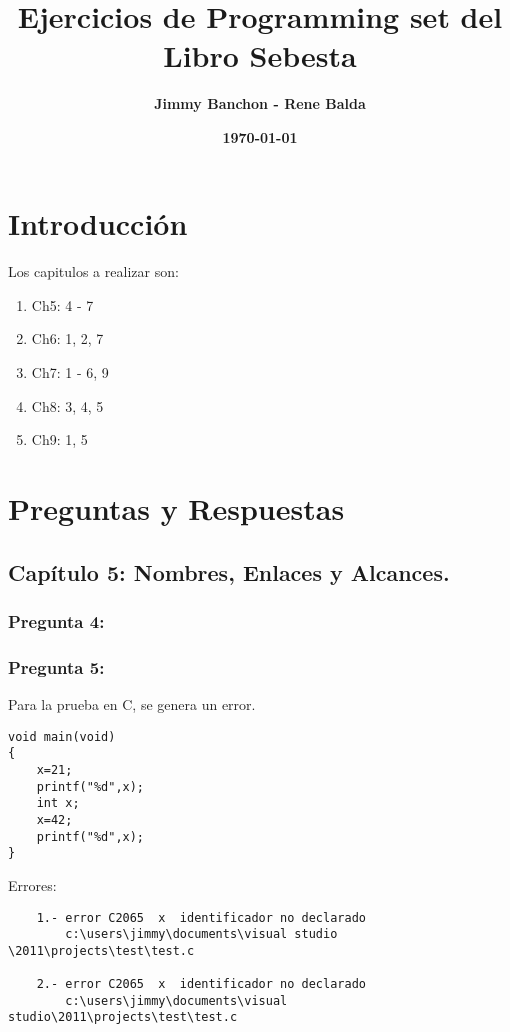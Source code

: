 \documentclass[11pt]{article}
\title{\textbf{Ejercicios de Programming set del Libro Sebesta}}
\author{\textbf{Jimmy Banchon - Rene Balda}}
\date{\textbf{\today}}
\begin{document}
\maketitle

\section{Introducción}
\paragraph{} \noindent
Los capitulos a realizar son:
\begin{enumerate}
\item
 Ch5: 4 - 7
\item
 Ch6: 1, 2, 7
\item
 Ch7: 1 - 6, 9
\item
 Ch8: 3, 4, 5
\item
 Ch9: 1, 5
\end{enumerate}

\section{Preguntas y Respuestas}

\subsection{Capítulo 5: Nombres, Enlaces y Alcances.}
\subsubsection{Pregunta 4:}


\subsubsection{Pregunta 5:}
Para la prueba en C, se genera un error.
\begin{lstlisting}[frame=single]
void main(void)
{
	x=21;
	printf("%d",x);
	int x;
	x=42;
	printf("%d",x);
}
\end{lstlisting}

\noindent Errores:

\begin{verbatim}
	1.-	error C2065  x  identificador no declarado	
		c:\users\jimmy\documents\visual studio \2011\projects\test\test.c

	2.-	error C2065  x  identificador no declarado	
		c:\users\jimmy\documents\visual studio\2011\projects\test\test.c
\end{verbatim}
\end{document}
